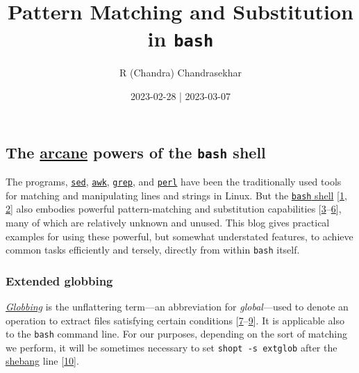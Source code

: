 \documentclass[
  a4paper,
]{article}
\title{Pattern Matching and Substitution in \texttt{bash}}
\author{R (Chandra) Chandrasekhar}
\date{2023-02-28 | 2023-03-07}
\begin{document}
\maketitle

\thispagestyle{empty}


\hypertarget{the-arcane-powers-of-the-bash-shell}{%
\subsection{\texorpdfstring{The
\href{https://www.thefreedictionary.com/arcane}{arcane} powers of the
\texttt{bash}
shell}{The arcane powers of the bash shell}}\label{the-arcane-powers-of-the-bash-shell}}

The programs, \href{https://www.gnu.org/software/sed/}{\texttt{sed}},
\href{https://www.grymoire.com/Unix/Awk.html}{\texttt{awk}},
\href{https://www.gnu.org/software/grep/manual/grep.html}{\texttt{grep}},
and
\href{https://learnbyexample.github.io/learn_perl_oneliners/line-processing.html}{\texttt{perl}}
have been the traditionally used tools for matching and manipulating
lines and strings in Linux. But the
\href{https://www.gnu.org/software/bash/}{\texttt{bash} shell}
{[}\protect\hyperlink{ref-newham2005}{1},
\protect\hyperlink{ref-ryder2018}{2}{]} also embodies powerful
pattern-matching and substitution capabilities
{[}\protect\hyperlink{ref-parametersubs}{3}--\protect\hyperlink{ref-stringops}{6}{]},
many of which are relatively unknown and unused. This blog gives
practical examples for using these powerful, but somewhat understated
features, to achieve common tasks efficiently and tersely, directly from
within \texttt{bash} itself.

\hypertarget{extended-globbing}{%
\subsubsection{Extended globbing}\label{extended-globbing}}

\href{https://en.wikipedia.org/w/index.php?title=Glob_(programming)\&oldid=1133836865}{\emph{Globbing}}
is the unflattering term---an abbreviation for \emph{global}---used to
denote an operation to extract files satisfying certain conditions
{[}\protect\hyperlink{ref-glob2023}{7}--\protect\hyperlink{ref-globhistory}{9}{]}.
It is applicable also to the \texttt{bash} command line. For our
purposes, depending on the sort of matching we perform, it will be
sometimes necessary to set \texttt{shopt\ -s\ extglob} after the
\href{https://en.wikipedia.org/wiki/Shebang_(Unix)}{shebang} line
{[}\protect\hyperlink{ref-extglob}{10}{]}.
\end{document}

